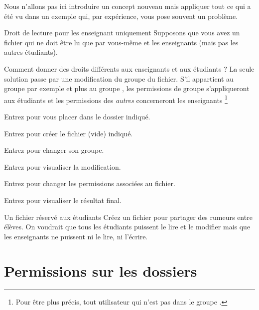 \documentclass[a4paper,11pt]{style-esi/td}
\begin{document}
		\begin{alertbox}
			Nous n'allons pas ici introduire un concept nouveau
			mais appliquer tout ce qui a été vu dans un exemple
			qui, par expérience, vous pose souvent un problème. 
		\end{alertbox}

		\begin{Tutoriel}{Droit de lecture pour les enseignant uniquement}
			Supposons que vous avez un fichier qui ne doit être
			lu que par vous-même et les en\-sei\-gnants 
			(mais pas les autres étudiants).

			Comment donner des droits différents aux enseignants et aux étudiants ?
			La seule solution passe par une modification du groupe du fichier.
			S'il appartient au groupe  par exemple
			et plus au groupe , les permissions de groupe
			s'appliqueront aux étudiants et les permissions des \emph{autres}
			concerneront les enseignants%
			\footnote{
				Pour être plus précis, 
				tout utilisateur qui n'est pas dans le groupe .
			}

			\begin{steps}
			\item 
				Entrez 
				pour vous placer dans le dossier indiqué.
			\item 
				Entrez  
				pour créer le fichier (vide) indiqué.
			\item 
				Entrez 
				pour changer son groupe.
			\item 
				Entrez  pour visualiser la modification.
			\item 
				Entrez 
				pour changer les permissions associées au fichier.
			\item 
				Entrez  pour visualiser le résultat final.
			\end{steps}
		\end{Tutoriel}

		\begin{Exercice}{Un fichier réservé aux étudiants}
			Créez un fichier 
			pour partager des rumeurs entre élèves.
			On voudrait que tous les étudiants puissent le lire et le modifier
			mais que les enseignants ne puissent ni le lire, ni l'écrire.
		\end{Exercice}

	\section{Permissions sur les dossiers}
\end{document}
